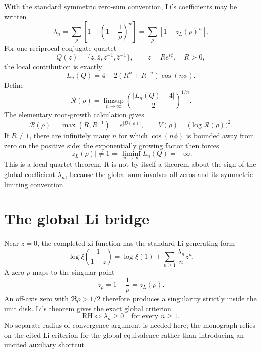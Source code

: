 With the standard symmetric zero-sum convention, Li's coefficients may be written \citep{li1997}
\begin{equation}
 \lambda_n
 =\sum_{\rho}\left[1-\left(1-\frac1\rho\right)^n\right]
 =\sum_{\rho}[1-z_L(\rho)^n].
 \label{eq:v2-li-coefficients}
\end{equation}
For one reciprocal-conjugate quartet
\begin{equation}
 Q(z)=\{z,\overline z,z^{-1},\overline z^{-1}\},
 \qquad z=Re^{i\phi},\quad R>0,
 \label{eq:v2-quartet}
\end{equation}
the local contribution is exactly
\begin{equation}
 \boxed{
 L_n(Q)=4-2(R^n+R^{-n})\cos(n\phi).
 }
 \label{eq:v2-local-li}
\end{equation}
Define
\begin{equation}
 \mathscr R(\rho)=
 \limsup_{n\to\infty}
 \left(\frac{|L_n(Q)-4|}{2}\right)^{1/n}.
 \label{eq:v2-growth-radius-def}
\end{equation}
The elementary root-growth calculation gives
\begin{equation}
 \boxed{\mathscr R(\rho)=\max(R,R^{-1})=e^{|B(\rho)|}},
 \qquad
 \boxed{V(\rho)=\bigl(\log\mathscr R(\rho)\bigr)^2}.
 \label{eq:v2-growth-radius}
\end{equation}
If $R\ne1$, there are infinitely many $n$ for which $\cos(n\phi)$ is bounded away from zero on the positive side; the exponentially growing factor then forces
\begin{equation}
 \boxed{|z_L(\rho)|\ne1\Longrightarrow
 \liminf_{n\to\infty}L_n(Q)=-\infty.}
 \label{eq:v2-local-negative-subsequence}
\end{equation}
This is a local quartet theorem. It is not by itself a theorem about the sign of the global coefficient $\lambda_n$, because the global sum involves all zeros and its symmetric limiting convention.

\section{The global Li bridge}

Near $z=0$, the completed xi function has the standard Li generating form
\begin{equation}
 \log\xi\!\left(\frac1{1-z}\right)
 =\log\xi(1)+\sum_{n\ge1}\frac{\lambda_n}{n}z^n.
 \label{eq:v2-li-generating}
\end{equation}
A zero $\rho$ maps to the singular point
\begin{equation}
 z_\rho=1-\frac1\rho=z_L(\rho).
 \label{eq:v2-li-singularity}
\end{equation}
An off-axis zero with $\Re\rho>1/2$ therefore produces a singularity strictly inside the unit disk. Li's theorem gives the exact global criterion
\begin{equation}
 \boxed{
 \text{RH}\iff\lambda_n\ge0\quad\text{for every }n\ge1.
 }
 \label{eq:v2-li-criterion}
\end{equation}
No separate radius-of-convergence argument is needed here; the monograph relies on the cited Li criterion for the global equivalence rather than introducing an uncited auxiliary shortcut.

